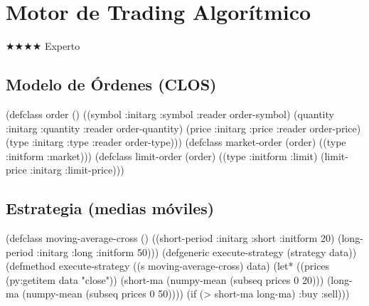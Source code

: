 \chapter{Motor de Trading Algorítmico}
\label{chap:trading-engine}
{\huge$\bigstar$}{\huge$\bigstar$}{\huge$\bigstar$}{\huge$\bigstar$} Experto

\section{Modelo de Órdenes (CLOS)}
\begin{lispcode}
(defclass order ()
  ((symbol :initarg :symbol :reader order-symbol)
   (quantity :initarg :quantity :reader order-quantity)
   (price :initarg :price :reader order-price)
   (type :initarg :type :reader order-type)))
(defclass market-order (order) ((type :initform :market)))
(defclass limit-order (order) ((type :initform :limit)
                               (limit-price :initarg :limit-price)))
\end{lispcode}

\section{Estrategia (medias móviles)}
\begin{lispcode}
(defclass moving-average-cross ()
  ((short-period :initarg :short :initform 20)
   (long-period :initarg :long :initform 50)))
(defgeneric execute-strategy (strategy data))
(defmethod execute-strategy ((s moving-average-cross) data)
  (let* ((prices (py:getitem data "close"))
         (short-ma (numpy-mean (subseq prices 0 20)))
         (long-ma (numpy-mean (subseq prices 0 50))))
    (if (> short-ma long-ma) :buy :sell)))
\end{lispcode}

